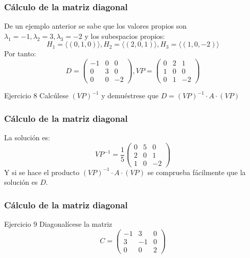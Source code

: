 \documentclass{beamer}
\begin{document}
\begin{frame}
\frametitle{C\'alculo de la matriz diagonal}
De un ejemplo anterior se sabe que los valores propios son $\lambda_1 = -1, \lambda_2 = 3, \lambda_3 = -2$ y los subespacios propios:
\[H_1 = \langle (0,1,0)\rangle, H_2 = \langle (2,0,1)\rangle, H_3 = \langle (1,0,-2)\rangle\]
Por tanto:
\[D=\left(\begin{array}{ccc}-1 & 0 & 0 \\0 & 3 & 0 \\0 & 0 & -2\end{array}\right), VP=\left(\begin{array}{ccc}0 & 2 & 1 \\1 & 0 & 0 \\0 & 1 & -2\end{array}\right)\]
\begin{block}{Ejercicio 8}
Calc\'ulese $(VP)^{-1}$ y demu\'estrese que $D=(VP)^{-1}\cdot A\cdot (VP)$
\end{block}
\end{frame}

\begin{frame}
\frametitle{C\'alculo de la matriz diagonal}
La soluci\'on es:
\[VP^{-1}=\frac{1}{5}\left(\begin{array}{ccc}0 & 5 & 0 \\2 & 0 & 1 \\1 & 0 & -2\end{array}\right)\]
Y si se hace el producto $(VP)^{-1}\cdot A\cdot (VP)$ se comprueba f\'acilmente que la soluci\'on es $D$. 
\end{frame}


\begin{frame}
\frametitle{C\'alculo de la matriz diagonal}
\begin{block}{Ejercicio 9}
Diagonal\'icese la matriz \[C=\left(\begin{array}{ccc}-1 & 3 & 0 \\3 & -1 & 0 \\0 & 0 & 2\end{array}\right)\]
\end{block}
\end{frame}
\end{document}
